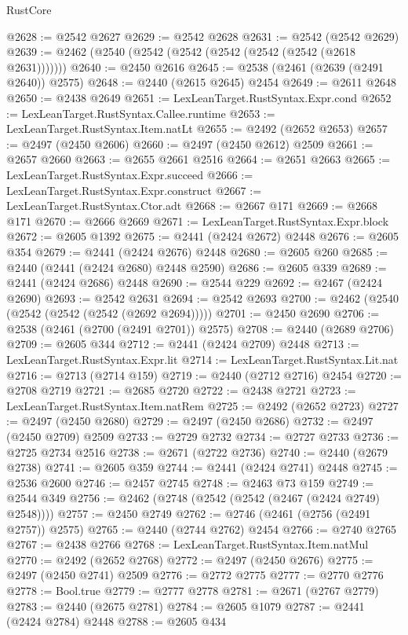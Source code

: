 \begin{lexlean}{RustCore}
\begin{coremodule}
@2628 := @2542 @2627
@2629 := @2542 @2628
@2631 := @2542 (@2542 @2629)
@2639 := @2462 (@2540 (@2542 (@2542 (@2542 (@2542 (@2542 (@2618 @2631)))))))
@2640 := @2450 @2616
@2645 := @2538 (@2461 (@2639 (@2491 @2640)) @2575)
@2648 := @2440 (@2615 @2645) @2454
@2649 := @2611 @2648
@2650 := @2438 @2649
@2651 := LexLeanTarget.RustSyntax.Expr.cond
@2652 := LexLeanTarget.RustSyntax.Callee.runtime
@2653 := LexLeanTarget.RustSyntax.Item.natLt
@2655 := @2492 (@2652 @2653)
@2657 := @2497 (@2450 @2606)
@2660 := @2497 (@2450 @2612) @2509
@2661 := @2657 @2660
@2663 := @2655 @2661 @2516
@2664 := @2651 @2663
@2665 := LexLeanTarget.RustSyntax.Expr.succeed
@2666 := LexLeanTarget.RustSyntax.Expr.construct
@2667 := LexLeanTarget.RustSyntax.Ctor.adt
@2668 := @2667 @171
@2669 := @2668 @171
@2670 := @2666 @2669
@2671 := LexLeanTarget.RustSyntax.Expr.block
@2672 := @2605 @1392
@2675 := @2441 (@2424 @2672) @2448
@2676 := @2605 @354
@2679 := @2441 (@2424 @2676) @2448
@2680 := @2605 @260
@2685 := @2440 (@2441 (@2424 @2680) @2448 @2590)
@2686 := @2605 @339
@2689 := @2441 (@2424 @2686) @2448
@2690 := @2544 @229
@2692 := @2467 (@2424 @2690)
@2693 := @2542 @2631
@2694 := @2542 @2693
@2700 := @2462 (@2540 (@2542 (@2542 (@2542 (@2692 @2694)))))
@2701 := @2450 @2690
@2706 := @2538 (@2461 (@2700 (@2491 @2701)) @2575)
@2708 := @2440 (@2689 @2706)
@2709 := @2605 @344
@2712 := @2441 (@2424 @2709) @2448
@2713 := LexLeanTarget.RustSyntax.Expr.lit
@2714 := LexLeanTarget.RustSyntax.Lit.nat
@2716 := @2713 (@2714 @159)
@2719 := @2440 (@2712 @2716) @2454
@2720 := @2708 @2719
@2721 := @2685 @2720
@2722 := @2438 @2721
@2723 := LexLeanTarget.RustSyntax.Item.natRem
@2725 := @2492 (@2652 @2723)
@2727 := @2497 (@2450 @2680)
@2729 := @2497 (@2450 @2686)
@2732 := @2497 (@2450 @2709) @2509
@2733 := @2729 @2732
@2734 := @2727 @2733
@2736 := @2725 @2734 @2516
@2738 := @2671 (@2722 @2736)
@2740 := @2440 (@2679 @2738)
@2741 := @2605 @359
@2744 := @2441 (@2424 @2741) @2448
@2745 := @2536 @2600
@2746 := @2457 @2745
@2748 := @2463 @73 @159
@2749 := @2544 @349
@2756 := @2462 (@2748 (@2542 (@2542 (@2467 (@2424 @2749) @2548))))
@2757 := @2450 @2749
@2762 := @2746 (@2461 (@2756 (@2491 @2757)) @2575)
@2765 := @2440 (@2744 @2762) @2454
@2766 := @2740 @2765
@2767 := @2438 @2766
@2768 := LexLeanTarget.RustSyntax.Item.natMul
@2770 := @2492 (@2652 @2768)
@2772 := @2497 (@2450 @2676)
@2775 := @2497 (@2450 @2741) @2509
@2776 := @2772 @2775
@2777 := @2770 @2776
@2778 := Bool.true
@2779 := @2777 @2778
@2781 := @2671 (@2767 @2779)
@2783 := @2440 (@2675 @2781)
@2784 := @2605 @1079
@2787 := @2441 (@2424 @2784) @2448
@2788 := @2605 @434

\end{coremodule}
\end{lexlean}
